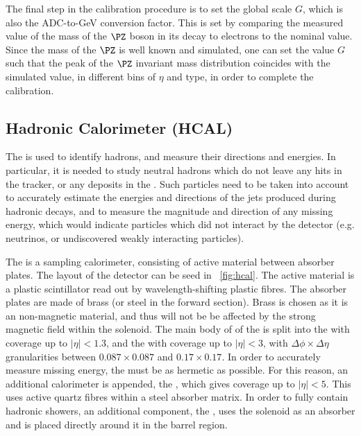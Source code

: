 The final step in the calibration procedure is to set the global scale $G$, which is also the ADC-to-GeV conversion factor. This is set by comparing the measured value of the mass of the $\PZ$ boson in its decay to electrons to the nominal value. Since the mass of the $\PZ$ is well known and simulated, one can set the value $G$ such that the peak of the $\PZ$ invariant mass distribution coincides with the simulated value, in different bins of $\eta$ and \SC type, in order to complete the calibration.


\subsection{Hadronic Calorimeter (HCAL)}
\label{sec:cms:hcal}

The \HCAL is used to identify hadrons, and measure their directions and energies. In particular, it is needed to study neutral hadrons which do not leave any hits in the tracker, or any deposits in the \ECAL. Such particles need to be taken into account to accurately estimate the energies and directions of the jets produced during hadronic decays, and to measure the magnitude and direction of any missing energy, which would indicate particles which did not interact by the \CMS detector (e.g. neutrinos, or undiscovered weakly interacting particles). 

The \CMS \HCAL is a sampling calorimeter, consisting of active material between absorber plates. The layout of the detector can be seed in \Fig~\ref{fig:hcal}. The active material is a plastic scintillator read out by wavelength-shifting plastic fibres. The absorber plates are made of brass (or steel in the forward section). Brass is chosen as it is an non-magnetic material, and thus will not be be affected by the strong magnetic field within the solenoid. The main body of of the \HCAL is split into the \HB with coverage up to $|\eta| < 1.3$, and the \HE with coverage up to $|\eta| < 3$, with $\Delta\phi \times \Delta\eta$ granularities between $0.087 \times 0.087$ and $ 0.17 \times 0.17$. In order to accurately measure missing energy, the \HCAL must be as hermetic as possible. For this reason, an additional calorimeter is appended, the \HF, which gives coverage up to $|\eta| <5$. This uses active quartz fibres within a steel absorber matrix. In order to fully contain hadronic showers, an additional component, the \HO, uses the solenoid as an absorber and is placed directly around it in the barrel region.~\cite{cmsHcal} 

